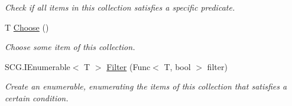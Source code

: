 \begin{DoxyCompactItemize}
\begin{DoxyCompactList}\small\item\em Check if all items in this collection satisfies a specific predicate. \end{DoxyCompactList}\item 
T \hyperlink{interface_c5_1_1_i_collection_value_af72d52ddd8ea4130d508e1cf020cf7eb}{Choose} ()
\begin{DoxyCompactList}\small\item\em Choose some item of this collection. \end{DoxyCompactList}\item 
S\+C\+G.\+I\+Enumerable$<$ T $>$ \hyperlink{interface_c5_1_1_i_collection_value_a485e8b464ed5dfb5f2ff5dc10a8a62d6}{Filter} (Func$<$ T, bool $>$ filter)
\begin{DoxyCompactList}\small\item\em Create an enumerable, enumerating the items of this collection that satisfies a certain condition. \end{DoxyCompactList}\end{DoxyCompactItemize}
